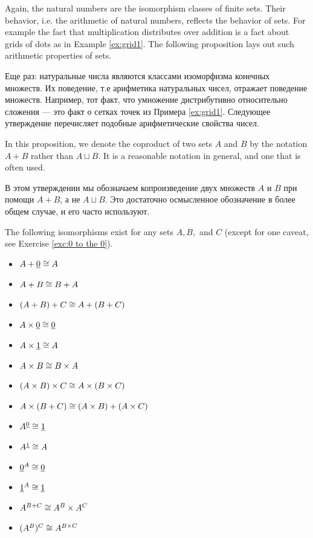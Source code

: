\documentclass[CT4S-EN-RU]{subfiles}
\begin{document}
\begin{blockENG}
Again, the natural numbers are the isomorphism classes of finite sets. Their behavior, i.e. the arithmetic of natural numbers, reflects the behavior of sets. For example the fact that multiplication distributes over addition is a fact about grids of dots as in Example \ref{ex:grid1}. The following proposition lays out such arithmetic properties of sets.
\end{blockENG}

\begin{blockRUS}
Еще раз: натуральные числа являются классами изоморфизма конечных множеств. Их поведение, т.е арифметика натуральных чисел, отражает поведение множеств. Например, тот факт, что умножение дистрибутивно относительно сложения — это факт о сетках точек из Примера \ref{ex:grid1}. Следующее утверждение перечисляет подобные арифметические свойства чисел.
\end{blockRUS}

\begin{blockENG}
In this proposition, we denote the coproduct of two sets $A$ and $B$ by the notation $A+B$ rather than $A\sqcup B$. It is a reasonable notation in general, and one that is often used. 
\end{blockENG}

\begin{blockRUS}
В этом утверждении мы обозначаем копроизведение двух множеств $A$ и $B$ при помощи $A+B$, а не $A\sqcup B$. Это достаточно осмысленное обозначение в более общем случае, и его часто используют. 
\end{blockRUS}

\begin{propositionENG}\label{prop:arithmetic of sets}
The following isomorphisms exist for any sets $A,B,$ and $C$ (except for one caveat, see Exercise \ref{exc:0 to the 0}). 
 
\begin{itemize}
\item $A+\underline{0}\cong A$
\item $A + B\cong B + A$
\item $(A + B) + C \cong A + (B + C)$
\item $A\times\underline{0}\cong\underline{0}$
\item $A\times\underline{1}\cong A$
\item $A\times B\cong B\times A$
\item $(A\times B)\times C \cong A\times (B\times C)$
\item $A\times(B+C)\cong (A\times B)+(A\times C)$
\item $A^{\underline{0}}\cong \underline{1}$
\item $A^{\underline{1}}\cong A$
\item $\underline{0}^A\cong\underline{0}$
\item $\underline{1}^A\cong\underline{1}$
\item $A^{B+C}\cong A^B\times A^C$
\item $(A^B)^C\cong A^{B\times C}$
\end{itemize}
\end{propositionENG}
\end{document}
